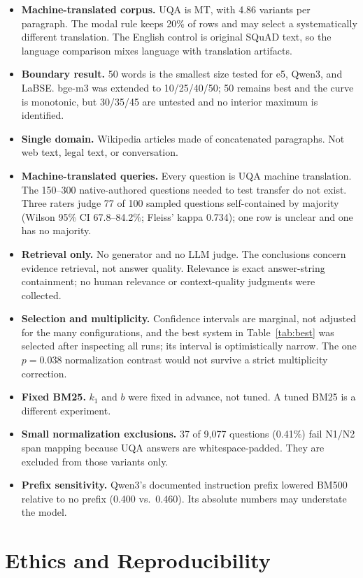 \documentclass[11pt]{article}
\newcommand{\bb}[1]{\textbf{#1}}
\begin{document}
\begin{itemize}
\item \bb{Machine-translated corpus.} UQA is MT, with 4.86 variants per paragraph. The modal rule
  keeps 20\% of rows and may select a systematically different translation. The English control is
  original SQuAD text, so the language comparison mixes language with translation artifacts.
\item \bb{Boundary result.} 50 words is the smallest size tested for e5, Qwen3, and LaBSE. bge-m3
  was extended to 10/25/40/50; 50 remains best and the curve is monotonic, but 30/35/45 are untested
  and no interior maximum is identified.
\item \bb{Single domain.} Wikipedia articles made of concatenated paragraphs. Not web text, legal
  text, or conversation.
\item \bb{Machine-translated queries.} Every question is UQA machine translation. The 150--300
  native-authored questions needed to test transfer do not exist. Three raters judge 77 of 100
  sampled questions self-contained by majority (Wilson 95\% CI 67.8--84.2\%; Fleiss' kappa 0.734);
  one row is unclear and one has no majority.
\item \bb{Retrieval only.} No generator and no LLM judge. The conclusions concern evidence
  retrieval, not answer quality. Relevance is exact answer-string containment; no human relevance
  or context-quality judgments were collected.
\item \bb{Selection and multiplicity.} Confidence intervals are marginal, not adjusted for the many
  configurations, and the best system in Table~\ref{tab:best} was selected after inspecting all
  runs; its interval is optimistically narrow. The one $p=0.038$ normalization contrast would not
  survive a strict multiplicity correction.
\item \bb{Fixed BM25.} $k_1$ and $b$ were fixed in advance, not tuned. A tuned BM25 is a different
  experiment.
\item \bb{Small normalization exclusions.} 37 of 9{,}077 questions (0.41\%) fail N1/N2 span
  mapping because UQA answers are whitespace-padded. They are excluded from those variants only.
\item \bb{Prefix sensitivity.} Qwen3's documented instruction prefix lowered BM500 relative to no
  prefix (0.400 vs.\ 0.460). Its absolute numbers may understate the model.
\end{itemize}

\section{Ethics and Reproducibility}
\end{document}
